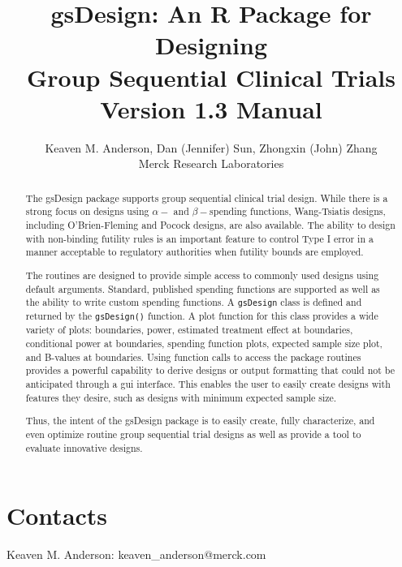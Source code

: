 \documentclass{article}%
\begin{document}
\title{gsDesign: An R Package for Designing \\Group Sequential Clinical Trials\\Version 1.3 Manual}
\author{Keaven M. Anderson, Dan (Jennifer) Sun, Zhongxin (John) Zhang\\Merck Research Laboratories}
\maketitle

\begin{abstract}
The gsDesign package supports group sequential clinical trial design. While
there is a strong focus on designs using $\alpha-$ and $\beta-$spending
functions, Wang-Tsiatis designs, including O'Brien-Fleming and Pocock designs,
are also available. The ability to design with non-binding futility rules is
an important feature to control Type I error in a manner acceptable to
regulatory authorities when futility bounds are employed.

The routines are designed to provide simple access to commonly used designs
using default arguments. Standard, published spending functions are supported
as well as the ability to write custom spending functions. A \texttt{gsDesign}
class is defined and returned by the \texttt{gsDesign()} function. A plot
function for this class provides a wide variety of plots: boundaries, power,
estimated treatment effect at boundaries, conditional power at boundaries,
spending function plots, expected sample size plot, and B-values at
boundaries. Using function calls to access the package routines provides a
powerful capability to derive designs or output formatting that could not be
anticipated through a gui interface. This enables the user to easily create
designs with features they desire, such as designs with minimum expected
sample size.

Thus, the intent of the gsDesign package is to easily create, fully
characterize, and even optimize routine group sequential trial designs as well
as provide a tool to evaluate innovative designs.

\end{abstract}
\tableofcontents




















\section{Contacts}

\bigskip

Keaven M. Anderson: keaven\_anderson@merck.com

\bigskip
\end{document}
